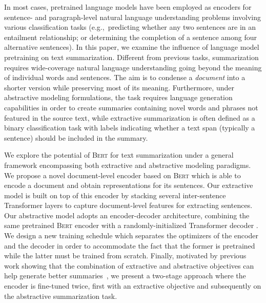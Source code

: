 \documentclass[11pt,a4paper]{article}
\begin{document}
    In most cases, pretrained language models have been employed as
    encoders for sentence- and paragraph-level natural language
    understanding problems \cite{devlin2018bert} involving various
    classification tasks (e.g.,~predicting whether any two sentences are
    in an entailment relationship; or determining the completion of a
    sentence among four alternative sentences).  
    In this paper, we examine
    the influence of language model pretraining on text
    summarization. Different from previous tasks, summarization requires
    wide-coverage natural language understanding going beyond the meaning
    of individual words and sentences. 
    The aim is to condense a
    \emph{document} into a shorter version while preserving most of its
    meaning. Furthermore, under abstractive modeling formulations, the task
    requires language generation capabilities in order to create summaries
    containing novel words and phrases not featured in the source text, while extractive summarization is often defined as a binary
    classification task with labels indicating whether a text span
    (typically a sentence) should be included in the summary.
    
    
    We explore the potential of \textsc{Bert} for text summarization under
    a general framework encompassing both extractive and abstractive
    modeling paradigms.  We propose a novel document-level encoder based
    on \textsc{Bert} which is able to encode a document and obtain
    representations for its sentences. Our extractive model is built on
    top of this encoder by stacking several inter-sentence Transformer
    layers to capture document-level features for extracting sentences.
    Our abstractive model adopts an encoder-decoder architecture,
    combining the same pretrained \textsc{Bert} encoder with a
    randomly-initialized Transformer decoder
    \cite{vaswani2017attention}. We design a new training schedule which
    separates the optimizers of the encoder and the decoder in order to
    accommodate the fact that the former is pretrained while the latter
    must be trained from scratch.  Finally, motivated by previous work
    showing that the combination of extractive and abstractive objectives
    can help generate better summaries~\cite{gehrmann2018bottom}, we
    present a two-stage approach where the encoder is fine-tuned twice,
    first with an extractive objective and subsequently on the abstractive
    summarization task.
    
\end{document}
